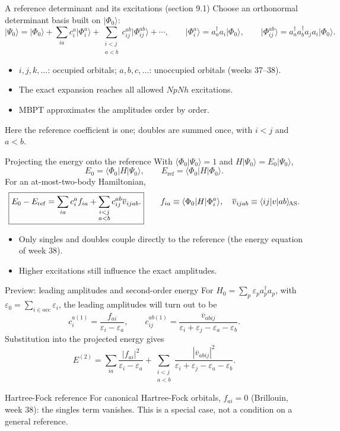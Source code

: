 \documentclass[aspectratio=169,10pt]{beamer}
\newcommand{\ket}[1]{\vert #1\rangle}
\newcommand{\braket}[2]{\langle #1\vert #2\rangle}
\newcommand{\mel}[3]{\langle #1\lvert #2\rvert #3\rangle}
\newcommand{\cre}[1]{a_{#1}^{\dagger}}
\newcommand{\ann}[1]{a_{#1}}
\newcommand{\vbar}[4]{\overline v_{#1#2#3#4}}
\newcommand{\Eref}{E_{\mathrm{ref}}}
\newcommand{\ph}{\Phi_0}
\newcommand{\Psizero}{\Psi_0}
\begin{document}
\begin{frame}{A reference determinant and its excitations (section 9.1)}
Choose an orthonormal determinant basis built on \(\ket{\ph}\):
\[
\ket{\Psizero}=\ket{\ph}
+\sum_{ia}c_i^a\ket{\Phi_i^a}
+\sum_{\substack{i<j\\a<b}}c_{ij}^{ab}\ket{\Phi_{ij}^{ab}}
+\cdots ,
\qquad
\ket{\Phi_i^a}=\cre{a}\ann{i}\ket{\ph},\qquad
\ket{\Phi_{ij}^{ab}}=\cre{a}\cre{b}\ann{j}\ann{i}\ket{\ph}.
\]
\begin{itemize}
\item \(i,j,k,\ldots\): occupied orbitals; \(a,b,c,\ldots\): unoccupied orbitals (weeks 37--38).
\item The exact expansion reaches all allowed \(NpNh\) excitations.
\item MBPT approximates the amplitudes order by order.
\end{itemize}
\smallskip
\small Here the reference coefficient is one; doubles are summed once, with \(i<j\) and \(a<b\).
\end{frame}

\begin{frame}{Projecting the energy onto the reference}
With \(\braket{\ph}{\Psizero}=1\) and \(H\ket{\Psizero}=E_0\ket{\Psizero}\),
\[
E_0=\mel{\ph}{H}{\Psizero},\qquad
\Eref=\mel{\ph}{H}{\ph}.
\]
For an at-most-two-body Hamiltonian,
\[
\boxed{E_0-\Eref
=\sum_{ia}c_i^a f_{ia}
+\sum_{\substack{i<j\\a<b}}c_{ij}^{ab}\vbar{i}{j}{a}{b}.}
\qquad
f_{ia}\equiv\mel{\ph}{H}{\Phi_i^a},\quad
\vbar{i}{j}{a}{b}\equiv\langle ij\lvert v\rvert ab\rangle_{\!\rm AS}.
\]
\begin{itemize}
\item Only singles and doubles couple directly to the reference (the energy equation of week 38).
\item Higher excitations still influence the exact amplitudes.
\end{itemize}
\end{frame}

\begin{frame}{Preview: leading amplitudes and second-order energy}
For \(H_0=\sum_p\varepsilon_p\cre{p}\ann{p}\), with \(\varepsilon_0=\sum_{i\in\mathrm{occ}}\varepsilon_i\), the leading amplitudes will turn out to be
\[
c_i^{a(1)}=\frac{f_{ai}}{\varepsilon_i-\varepsilon_a},\qquad
c_{ij}^{ab(1)}=\frac{\vbar{a}{b}{i}{j}}
 {\varepsilon_i+\varepsilon_j-\varepsilon_a-\varepsilon_b}.
\]
Substitution into the projected energy gives
\[
E^{(2)}=
\sum_{ia}\frac{|f_{ai}|^2}{\varepsilon_i-\varepsilon_a}
+\sum_{\substack{i<j\\a<b}}
\frac{|\vbar{a}{b}{i}{j}|^2}
 {\varepsilon_i+\varepsilon_j-\varepsilon_a-\varepsilon_b}.
\]
\begin{exampleblock}{Hartree-Fock reference}
For canonical Hartree-Fock orbitals, \(f_{ai}=0\) (Brillouin, week 38): the singles term vanishes. This is a special case, not a condition on a general reference.
\end{exampleblock}
\end{frame}
\end{document}
